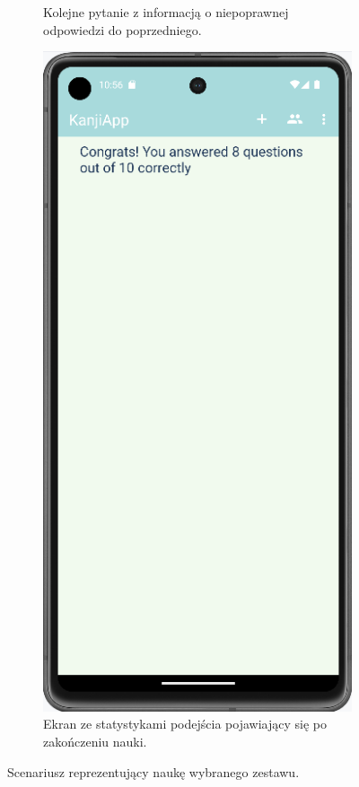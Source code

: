 \documentclass[a4paper,twoside,12pt]{book}
\begin{document}
\begin{figure}
\begin{subfigure}{0.3\textwidth}
   \caption{Kolejne pytanie z informacją o niepoprawnej odpowiedzi do poprzedniego.}
   \label{fig:stats}
\end{subfigure}
\hfill
\begin{subfigure}{0.3\textwidth}
   \includegraphics[width=\textwidth]{learn/stats}
   \caption{Ekran ze statystykami podejścia pojawiający się po zakończeniu nauki.}
   \label{fig:stats}
\end{subfigure}
\hfill
\rule{0cm}{1cm}

\caption{Scenariusz reprezentujący naukę wybranego zestawu.}
\label{fig:study}
\end{figure}
\end{document}
